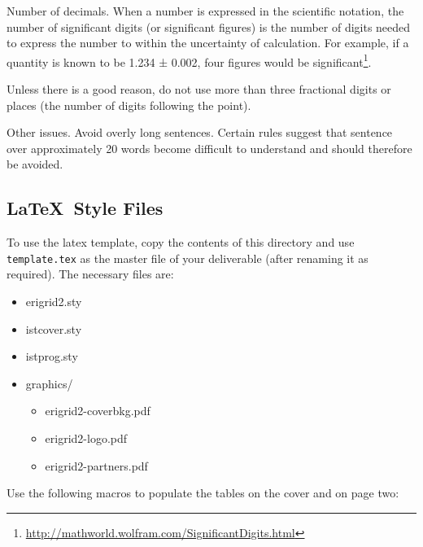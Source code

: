Number of decimals. When a number is expressed in the scientific notation, the number of significant digits (or significant figures) is the number of digits needed to express the number to within the uncertainty of calculation. For example, if a quantity is known to be 1.234 ± 0.002, four figures would be significant\footnote{\url{http://mathworld.wolfram.com/SignificantDigits.html}}.

Unless there is a good reason, do not use more than three fractional digits or places (the number of digits following the point).

Other issues. Avoid overly long sentences. Certain rules suggest that sentence over approximately 20 words become difficult to understand and should therefore be avoided. 

\subsection{\LaTeX\ Style Files}
\label{sec:latex-style-files}

\newcommand{\macro}[1]{{\tt \textbackslash #1}}

To use the latex template, copy the contents of this directory and use {\tt template.tex} as the master file of your deliverable (after renaming it as required). The necessary files are:

\begin{itemize}
    \item erigrid2.sty
    \item istcover.sty
    \item istprog.sty
    \item graphics/
    \begin{itemize}
        \item erigrid2-coverbkg.pdf
        \item erigrid2-logo.pdf
        \item erigrid2-partners.pdf
    \end{itemize}
\end{itemize}

Use the following macros to populate the tables on the cover and on page two:


